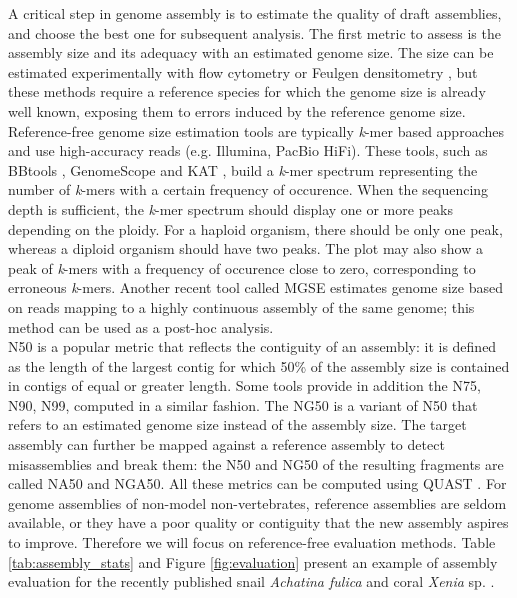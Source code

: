 A critical step in genome assembly is to estimate the quality of draft assemblies, and choose the best one for subsequent analysis. The first metric to assess is the assembly size and its adequacy with an estimated genome size. The size can be estimated experimentally with flow cytometry or Feulgen densitometry \cite{mulligan2014}, but these methods require a reference species for which the genome size is already well known, exposing them to errors induced by the reference genome size. Reference-free genome size estimation tools are typically \textit{k}-mer based approaches and use high-accuracy reads (e.g. Illumina, PacBio HiFi). These tools, such as BBtools \cite{bbtools}, GenomeScope \cite{genomescope} and KAT \cite{kat_evaluation}, build a \textit{k}-mer spectrum representing the number of \textit{k}-mers with a certain frequency of occurence. When the sequencing depth is sufficient, the \textit{k}-mer spectrum should display one or more peaks depending on the ploidy. For a haploid organism, there should be only one peak, whereas a diploid organism should have two peaks. The plot may also show a peak of \textit{k}-mers with a frequency of occurence close to zero, corresponding to erroneous \textit{k}-mers. Another recent tool called MGSE \cite{mgse} estimates genome size based on reads mapping to a highly continuous assembly of the same genome; this method can be used as a post-hoc analysis. \\

N50 is a popular metric that reflects the contiguity of an assembly: it is defined as the length of the largest contig for which 50\% of the assembly size is contained in contigs of equal or greater length. Some tools provide in addition the N75, N90, N99, computed in a similar fashion. The NG50 is a variant of N50 that refers to an estimated genome size instead of the assembly size. The target assembly can further be mapped against a reference assembly to detect misassemblies and break them: the N50 and NG50 of the resulting fragments are called NA50 and NGA50. All these metrics can be computed using QUAST \cite{quast}. For genome assemblies of non-model non-vertebrates, reference assemblies are seldom available, or they have a poor quality or contiguity that the new assembly aspires to improve. Therefore we will focus on reference-free evaluation methods. Table \ref{tab:assembly_stats} and Figure \ref{fig:evaluation} present an example of assembly evaluation for the recently published snail \textit{Achatina fulica} \cite{achatina_fulica} and coral \textit{Xenia} sp. \cite{xenia_sp}. \\

